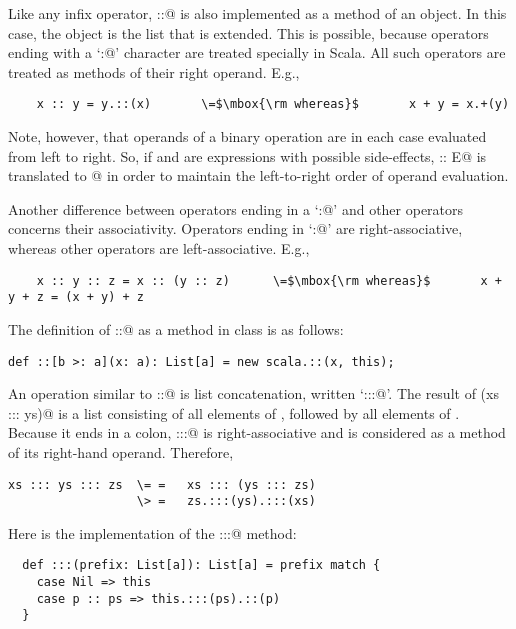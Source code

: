 \documentclass[11pt]{book}
\begin{document}
Like any infix operator, \verb@::@
is also implemented as a method of an object. In this case, the object
is the list that is extended. This is possible, because operators
ending with a `\verb@:@' character are treated specially in Scala.  
All such operators are treated as methods of their right operand. E.g.,
\begin{verbatim}
    x :: y = y.::(x)       \=$\mbox{\rm whereas}$       x + y = x.+(y)                  
\end{verbatim}
Note, however, that operands of a binary operation are in each case
evaluated from left to right.  So, if \verb@D@ and \verb@E@ are
expressions with possible side-effects, \verb@D :: E@ is translated to
@ in order to maintain the left-to-right
order of operand evaluation.

Another difference between operators ending in a `\verb@:@' and other
operators concerns their associativity.  Operators ending in
`\verb@:@' are right-associative, whereas other operators are
left-associative.  E.g.,
\begin{verbatim}
    x :: y :: z = x :: (y :: z)      \=$\mbox{\rm whereas}$       x + y + z = (x + y) + z
\end{verbatim}
The definition of \verb@::@ as a method in
class \verb@List@ is as follows:
\begin{verbatim}
def ::[b >: a](x: a): List[a] = new scala.::(x, this);
\end{verbatim}
An operation similar to \verb@::@ is list concatenation, written
`\verb@:::@'. The result of \verb@(xs ::: ys)@ is a list consisting of
all elements of \verb@xs@, followed by all elements of \verb@ys@.
Because it ends in a colon, \verb@:::@ is right-associative and is
considered as a method of its right-hand operand. Therefore,
\begin{verbatim}
xs ::: ys ::: zs  \= =   xs ::: (ys ::: zs)
                  \> =   zs.:::(ys).:::(xs)
\end{verbatim}
Here is the implementation of the \verb@:::@ method:
\begin{verbatim}
  def :::(prefix: List[a]): List[a] = prefix match {
    case Nil => this
    case p :: ps => this.:::(ps).::(p)
  }
\end{verbatim}
\end{document}
